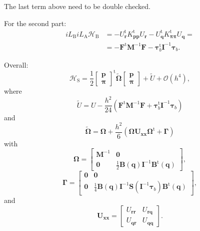 \documentclass[journal=jctcce,manuscript=article,layout=twocolumn]{achemso}
\newcommand{\mt}[1]{\boldsymbol{\mathbf{#1}}}   %
\newcommand{\vt}[1]{\boldsymbol{\mathbf{#1}}}   %
\newcommand{\tr}[1]{#1^\text{t}}                %
\newcommand{\Ham}[1]{{\mathcal H}_\text{#1}}    %
\newcommand{\Liu}[1]{i\!L_\text{#1}}            %
\newcommand{\timestep}{h}
\begin{document}
The last term above need to be double checked.

For the second part:
\begin{align*}
\Liu B \Liu A \Ham B &= -\tr{U_{\vt r}} \tr{K_{\vt p \vt p}} U_{\vt r} - \tr{U_{\vt q}} \tr{K_{\vt \pi \vt \pi}} U_{\vt q} = \\
&= -\tr{\vt F} {\mt M}^{-1} {\vt F} - \tr{\vt \tau}_b {\mt I}^{-1} {\vt \tau}_b.
\end{align*}

Overall:
\begin{equation*}
\Ham S = \frac{1}{2} \tr{\left[\begin{array}{c} \vt p \\ \vt \pi \end{array}\right]} \tilde{\mt \Omega} \left[\begin{array}{c} \vt p \\ \vt \pi \end{array}\right] + \tilde{U} + \mathcal{O}({\timestep}^4),
\end{equation*}
where
\begin{equation*}
\tilde{U} = U - \frac{\timestep^2}{24} \left( \tr{\vt F} {\mt M}^{-1} {\vt F} + \tr{\vt \tau}_b {\mt I}^{-1} {\vt \tau}_b \right)
\end{equation*}
and
\begin{equation*}
\tilde{\mt \Omega} = {\mt \Omega} + \frac{\timestep^2}{6} \left( {\mt \Omega} {\mt U}_{\vt x \vt x} \tr{\mt \Omega} + {\mt \Gamma} \right)
\end{equation*}
with
\begin{equation*}
\mt \Omega = \left[\begin{array}{cc}
{\mt M}^{-1} & \mt 0 \\
\mt 0 & \frac{1}{2} {\mt B}(\vt q) {\mt I}^{-1} \tr{\mt B}(\vt q)
\end{array}\right],
\end{equation*}
\begin{equation*}
\mt \Gamma = \left[\begin{array}{cc}
\mt 0 & \mt 0 \\
\mt 0 & \frac{1}{4} {\mt B}(\vt q) {\mt I}^{-1} {\mt S}({\mt I}^{-1} {\vt \tau}_b) \tr{\mt B}(\vt q)
\end{array}\right],
\end{equation*}
and
\begin{equation*}
{\mt U}_{\vt x \vt x} = \left[\begin{array}{cc}
U_{\vt r \vt r} & U_{\vt r \vt q} \\
U_{\vt q \vt r} & U_{\vt q \vt q}
\end{array}\right].
\end{equation*}
\end{document}
